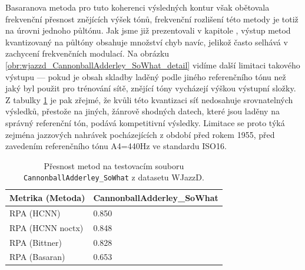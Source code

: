 Basaranova metoda pro tuto koherenci výsledných kontur však obětovala frekvenční přesnost znějících výšek tónů, frekvenční rozlišení této metody je totiž na úrovni jednoho půltónu. Jak jsme již prezentovali v kapitole , výstup metod kvantizovaný na půltóny obsahuje množství chyb navíc, jelikož často selhává v zachycení frekvenčních modulací. Na obrázku \ref{obr:wjazzd_CannonballAdderley_SoWhat_detail} vidíme další limitaci takového výstupu --- pokud je obsah skladby laděný podle jiného referenčního tónu než jaký byl použit pro trénování sítě, znějící tóny vycházejí výškou  výstupní složky. Z tabulky \ref{tab:wjazzd_CannonballAdderley_SoWhat} je pak zřejmé, že kvůli této kvantizaci síť nedosahuje srovnatelných výsledků, přestože na jiných, žánrově shodných datech, které jsou laděny na správný referenční tón, podává kompetitivní výsledky. Limitace se proto týká zejména jazzových nahrávek pocházejících z období před rokem 1955, před zavedením referenčního tónu A4=440Hz ve standardu ISO16.
\begin{table}[h]
\centering
\begin{tabular}{ll}
\toprule
 Metrika (Metoda) & CannonballAdderley\_SoWhat \\
\midrule
       RPA (HCNN) &                     0.850 \\
 RPA (HCNN noctx) &                     0.848 \\
    RPA (Bittner) &                     0.828 \\
    RPA (Basaran) &                     0.653 \\
\bottomrule
\end{tabular}



\caption{Přesnost metod na testovacím souboru \texttt{Cannonball\allowbreak{}Adderley\allowbreak{}\_So\allowbreak{}What} z datasetu WJazzD.}\label{tab:wjazzd_CannonballAdderley_SoWhat}
\end{table}


